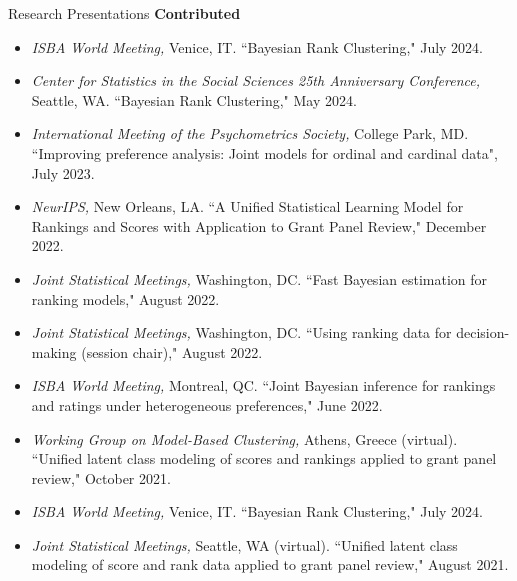 \documentclass{resume} %
\begin{document}
\begin{rSection}{Research Presentations}
\textbf{Contributed}
\begin{itemize}
\item \textit{ISBA World Meeting,} Venice, IT. ``Bayesian Rank Clustering," July 2024.
\item \textit{Center for Statistics in the Social Sciences 25th Anniversary Conference,} Seattle, WA. ``Bayesian Rank Clustering," May 2024.
\item \textit{International Meeting of the Psychometrics Society,} College Park, MD. ``Improving preference analysis: Joint models for ordinal and cardinal data", July 2023.
\item \textit{NeurIPS,} New Orleans, LA. ``A Unified Statistical Learning Model for Rankings and Scores with Application to Grant Panel Review," December 2022.
\item \textit{Joint Statistical Meetings,} Washington, DC. ``Fast Bayesian estimation for ranking models," August 2022.
\item \textit{Joint Statistical Meetings,} Washington, DC. ``Using ranking data for decision-making (session chair)," August 2022.
\item \textit{ISBA World Meeting,} Montreal, QC. ``Joint Bayesian inference for rankings and ratings under heterogeneous preferences," June 2022.
\item \textit{Working Group on Model-Based Clustering,} Athens, Greece (virtual). ``Unified latent class modeling of scores and rankings applied to grant panel review," October 2021.
\item \textit{ISBA World Meeting,} Venice, IT. ``Bayesian Rank Clustering," July 2024.
\item \textit{Joint Statistical Meetings,} Seattle, WA (virtual). ``Unified latent class modeling of score and rank data applied to grant panel review," August 2021.
\end{itemize}

\end{rSection}
\end{document}
